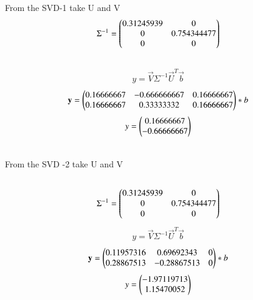 \documentclass[journal,12pt,twocolumn]{IEEEtran}
\begin{document}
\solution
From the SVD-1 take U and V
\\
\begin{align*}
{\Sigma}^{-1}=\begin{pmatrix}0.31245939& 0\\0 & 0.754344477\\ 0 & 0\end{pmatrix}
\end{align*}
\\
\begin{align*}
y= \vec{V}\Sigma^{-1} \vec{U}^T \vec{b}
\end{align*}
\begin{align*}
\mathbf{y}=\begin{pmatrix}	0.16666667	& -0.666666667 & 0.16666667\\	
	0.16666667	& 0.33333332 & 0.16666667  \end{pmatrix}*b
\end{align*}
\begin{align*}
y=\begin{pmatrix}	0.16666667	\\ -0.66666667\end{pmatrix}
\end{align*}

\\
From the SVD -2 take U and V
\\
\begin{align}
\\{\Sigma}^{-1}=\begin{pmatrix}0.31245939& 0\\0 & 0.754344477\\ 0 & 0\end{pmatrix}
\end{align}
\begin{align*}
y= \vec{V}\Sigma^{-1} \vec{U}^T \vec{b}
\end{align*}
\begin{align*}
\mathbf{y}=\begin{pmatrix}	0.11957316	& 0.69692343 & 0\\	
	0.28867513	& -0.28867513 & 0  \end{pmatrix}*b
\end{align*}
\begin{align*}
y=\begin{pmatrix}	-1.97119713	\\ 1.15470052\end{pmatrix}
\end{align*}

\newpage
\end{document}
